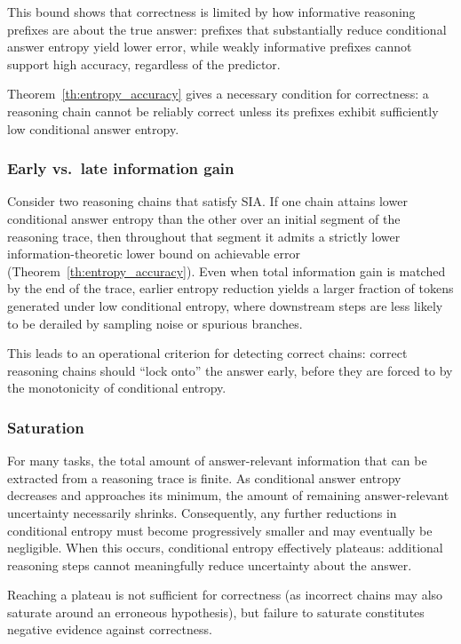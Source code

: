 \documentclass{article}
\begin{document}
This bound shows that correctness is limited by how informative reasoning prefixes are about the true answer: prefixes that substantially reduce conditional answer entropy yield lower error, while weakly informative prefixes cannot support high accuracy, regardless of the predictor.

Theorem~\ref{th:entropy_accuracy} gives a necessary condition for correctness: a reasoning chain cannot be reliably correct unless its prefixes exhibit sufficiently low conditional answer entropy.

\subsubsection{Early vs.\ late information gain}
\label{subsec:early_vs_late}

Consider two reasoning chains that satisfy SIA. If one chain attains lower conditional answer entropy than the other over an initial segment of the reasoning trace, then throughout that segment it admits a strictly lower information-theoretic lower bound on achievable error (Theorem~\ref{th:entropy_accuracy}). Even when total information gain is matched by the end of the trace, earlier entropy reduction yields a larger fraction of tokens generated under low conditional entropy, where downstream steps are less likely to be derailed by sampling noise or spurious branches.

This leads to an operational criterion for detecting correct chains: correct reasoning chains should “lock onto” the answer early, before they are forced to by the monotonicity of conditional entropy.

\subsubsection{Saturation}

For many tasks, the total amount of answer-relevant information that can be extracted from a reasoning trace is finite. As conditional answer entropy decreases and approaches its minimum, the amount of remaining answer-relevant uncertainty necessarily shrinks. Consequently, any further reductions in conditional entropy must become progressively smaller and may eventually be negligible. When this occurs, conditional entropy effectively plateaus: additional reasoning steps cannot meaningfully reduce uncertainty about the answer. 

Reaching a plateau is not sufficient for correctness (as incorrect chains may also saturate around an erroneous hypothesis), but failure to saturate constitutes negative evidence against correctness.
\end{document}
